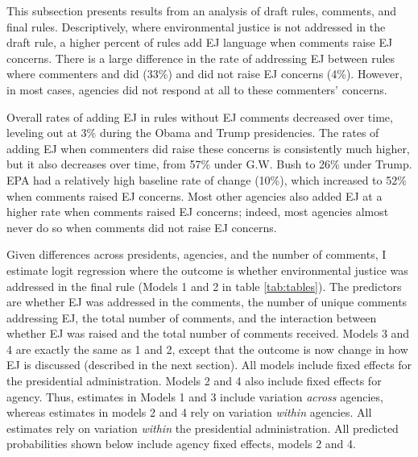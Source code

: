 \documentclass[
      12pt,
        ]{article}
\begin{document}
This subsection presents results from an analysis of draft
rules, comments, and final rules. Descriptively,
where environmental
justice is not addressed in the draft rule, a higher percent of rules add EJ language when comments raise EJ concerns. There is a large difference in the rate of addressing EJ between rules where commenters and did (33\%) and did not raise EJ concerns (4\%). However, in most cases, agencies did not respond at all to these commenters' concerns.

Overall rates of adding EJ in rules without EJ comments decreased over time, leveling out at 3\% during the Obama and Trump presidencies. The rates of adding EJ when commenters did raise these concerns is consistently much higher, but it also decreases over time, from 57\% under G.W. Bush to 26\% under Trump.
EPA had a relatively high baseline rate of change (10\%), which increased to 52\% when comments raised EJ concerns. Most other agencies also added EJ at a higher rate when comments raised EJ concerns; indeed, most agencies almost never do so when comments did not raise EJ concerns.

Given differences across presidents, agencies, and the number of comments, I estimate logit regression where the outcome is whether environmental justice was addressed in the final rule (Models 1 and 2 in table \ref{tab:tables}). The predictors are
whether EJ was addressed in the comments, the number of unique comments addressing EJ, the total number of comments, and the interaction between whether EJ was raised and the total number of comments received. Models 3 and 4 are exactly the same as 1 and 2, except that the outcome is now change in how EJ is discussed (described in the next section). All models include fixed effects for the presidential administration. Models 2 and 4 also include fixed effects for agency. Thus, estimates in Models 1 and 3 include variation \emph{across} agencies, whereas estimates in models 2 and 4 rely on variation \emph{within} agencies. All estimates rely on variation \emph{within} the presidential administration.
All predicted probabilities shown below include agency fixed effects, models 2 and 4.
\end{document}
